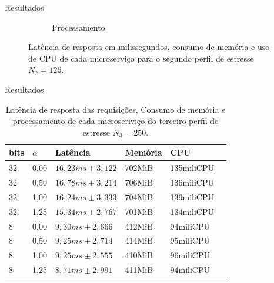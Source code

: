 \begin{frame}{Resultados}
\begin{figure}[H]
\begin{subfigure}[b]{0.32\textwidth}
            \caption{\scriptsize{Processamento}}
        \end{subfigure}
        \caption{\scriptsize{Latência de resposta em milissegundos, consumo de memória e uso de CPU de cada microserviço para o segundo perfil de estresse $N_2 = 125$.}}
        \end{figure}
\end{frame}

\begin{frame}{Resultados}
    \scriptsize
    \begin{table}[H]
        \caption{\scriptsize{Latência de resposta das requisições, Consumo de memória e processamento de cada microseriviço do terceiro perfil de estresse $N_3 = 250$.}}
        \centering
        \begin{tabular}{llllll} \\
        \hline
        \textbf{bits} & \textbf{$\alpha$}  &  \textbf{Latência} & \textbf{Memória} &\textbf{CPU}\\  \hline
        32 &0,00& $16,23ms \pm 3,122$ & 702MiB & 135miliCPU\\
        32 &0,50& $16,78ms \pm 3,214$ & 706MiB & 136miliCPU\\
        32 &1,00& $16,24ms \pm 3,333$ & 704MiB & 139miliCPU\\
        32 &1,25& $15,34ms \pm 2,767$ & 701MiB & 134miliCPU\\
        8  &0,00& $9,30ms \pm 2,666$ & 412MiB & 94miliCPU\\
        8  &0,50& $9,25ms \pm 2,714$ & 414MiB & 95miliCPU\\
        8  &1,00& $9,25ms \pm 2,555$ & 410MiB & 96miliCPU\\
        8  &1,25& $8,71ms \pm 2,991$ & 411MiB & 94miliCPU\\
        \hline
        \end{tabular}
        \end{table}
\end{frame}


